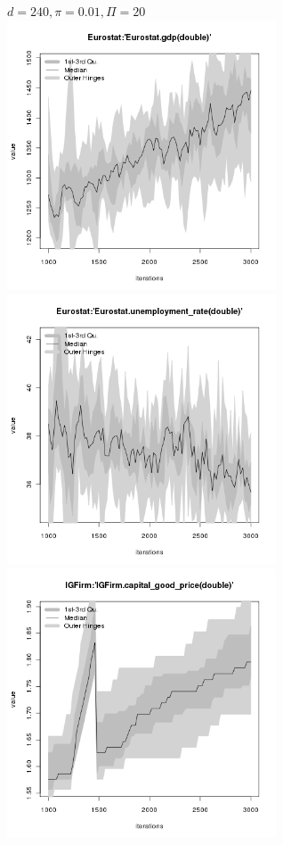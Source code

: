 \begin{figure}[ht!]
\centering\leavevmode
\begin{minipage}{17cm}
\centering\leavevmode
{$d=240, \pi=0.01, \Pi=20$}\\
\includegraphics[width=8cm]{./energy_shock/png/duration_240/intensity_0.01/frequency_20/Eurostat-gdp.png}
\includegraphics[width=8cm]{./energy_shock/png/duration_240/intensity_0.01/frequency_20/Eurostat-unemployment_rate.png}
\includegraphics[width=8cm]{./energy_shock/png/duration_240/intensity_0.01/frequency_20/IGFirm-capital_good_price.png}

\end{minipage}
\end{figure}
